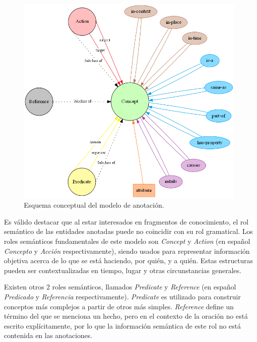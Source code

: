 \begin{figure}[H]
	\includegraphics[width=\linewidth]{graphics/annotation_model.png}
	\caption[Esquema conceptual del modelo de anotación]{Esquema conceptual del modelo de anotación.}
	\label{fig:annotation_model}
\end{figure}

Es válido destacar que al estar interesados en fragmentos de conocimiento, el rol semántico de las entidades anotadas puede no coincidir con su rol gramatical. Los roles semánticos fundamentales de este modelo son \textit{Concept} y \textit{Action} (en español \textit{Concepto} y \textit{Acción} respectivamente), siendo usados para representar información objetiva acerca de lo que se está haciendo, por quién, y a quién. Estas estructuras pueden ser contextualizadas en tiempo, lugar y otras circunstancias generales.

Existen otros 2 roles semánticos, llamados \textit{Predicate} y \textit{Reference} (en español \textit{Predicado} y \textit{Referencia} respectivamente). \textit{Predicate} es utilizado para construir conceptos más complejos a partir de otros más simples. \textit{Reference} define un término del que se menciona un hecho, pero en el contexto de la oración no está escrito explícitamente, por lo que la información semántica de este rol no está contenida en las anotaciones.

